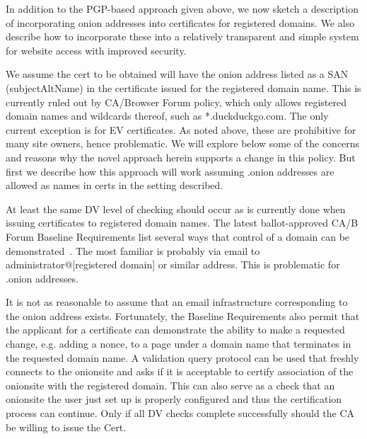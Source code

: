 \documentclass[10pt, conference, compsocconf]{styles/IEEEtran}
\begin{document}
In addition to the PGP-based approach given above,
we now sketch a description of incorporating onion addresses into
certificates for registered domains. We also describe how to
incorporate these into a relatively transparent and simple system for
website access with improved security. 


We assume the cert to be obtained will have the onion address listed
as a SAN (subjectAltName) in the certificate issued for the registered
domain name.  This is currently ruled out by CA/Browser Forum policy,
which only allows registered domain names and wildcards thereof, such
as *.duckduckgo.com. The only current exception is for EV
certificates.  As noted above, these are prohibitive for many site
owners, hence problematic. We will explore below some of the concerns
and reasons why the novel approach herein supports a change in this
policy. But first we describe how this approach will work assuming
.onion addresses are allowed as names in certs in the setting
described.

At least the same DV level of checking should occur as is currently
done when issuing certificates to registered domain names. The latest
ballot-approved CA/B Forum Baseline Requirements list several ways
that control of a domain can be demonstrated~\cite{cabforum-br}.  The
most familiar is probably via email to administrator@[registered domain]
or similar address. This is problematic for .onion addresses.

It is not as reasonable to assume that an email infrastructure
corresponding to the onion address exists.
Fortunately, the Baseline Requirements also permit
that the applicant for a certificate can demonstrate the ability
to make a requested change, e.g. adding a nonce, to a
page under a domain name that terminates in the requested domain name. 
A  validation query protocol can be used
that freshly connects to the onionsite and asks if it is acceptable to
certify association of the onionsite with the registered domain.  This
can also serve as a check that an onionsite the user just set up is
properly configured and thus the certification process can continue.
Only if all DV checks complete successfully should the CA be willing
to issue the Cert.
\end{document}
